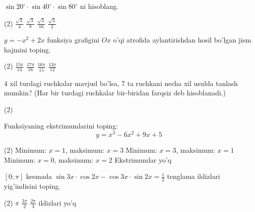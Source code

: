 \documentclass[14pt]{article}
\begin{document}
\begin{taskbox}
\(\sin 20^\circ \cdot \sin 40^\circ \cdot \sin 80^\circ\) ni hisoblang.
 \vspace{0.2cm} \begin{tasks}(2)
\task \(\frac{\sqrt{3}}{4}\)
\task \(\frac{\sqrt{3}}{8}\)
\task \(\frac{\sqrt{3}}{16}\)
\task \(\frac{\sqrt{3}}{2}\)
\end{tasks}
\vspace{2cm}
\end{taskbox}

\begin{taskbox}
\(y = -x^2 + 2x\) funksiya grafigini \(Ox\) o'qi atrofida aylantirishdan hosil bo'lgan jism hajmini toping.
 \vspace{0.2cm} \begin{tasks}(2)
\task \(\frac{15\pi}{14}\)
\task \(\frac{17\pi}{16}\)
\task \(\frac{16\pi}{15}\)
\task \(\frac{13\pi}{12}\)
\end{tasks}
\vspace{2cm}
\end{taskbox}

\begin{taskbox}
4 xil turdagi ruchkalar mavjud bo'lsa, 7 ta ruchkani necha xil usulda tanlash mumkin? (Har bir turdagi ruchkalar bir-biridan farqsiz deb hisoblanadi.)
 \vspace{0.2cm} \begin{tasks}(2)
\end{tasks}
\vspace{2cm}
\end{taskbox}

\begin{taskbox}
Funksiyaning ekstrimumlarini toping:
\[
y = x^3 - 6x^2 + 9x + 5
\]
 \vspace{0.2cm} \begin{tasks}(2)
 \task Minimum:  $x = 1$, maksimum: $x = 3$
\task Minimum:  $x = 3$, maksimum: $x = 1$
\task Minimum:  $x = 0$, maksimum: $x = 2$
\task Ekstrimumlar yo'q
 
\end{tasks}
\vspace{2cm}
\end{taskbox}

\begin{taskbox}
\([0; \pi]\) kesmada \(\sin 3x \cdot \cos 2x - \cos 3x \cdot \sin 2x = \frac{1}{2}\) tenglama ildizlari yig'indisini toping.
 \vspace{0.2cm} \begin{tasks}(2)
\task \(\pi\)
\task \(\frac{3\pi}{2}\)
\task \(\frac{2\pi}{3}\)
\task ildizlari yo'q
\end{tasks}
\vspace{2cm}
\end{taskbox}
\end{document}
